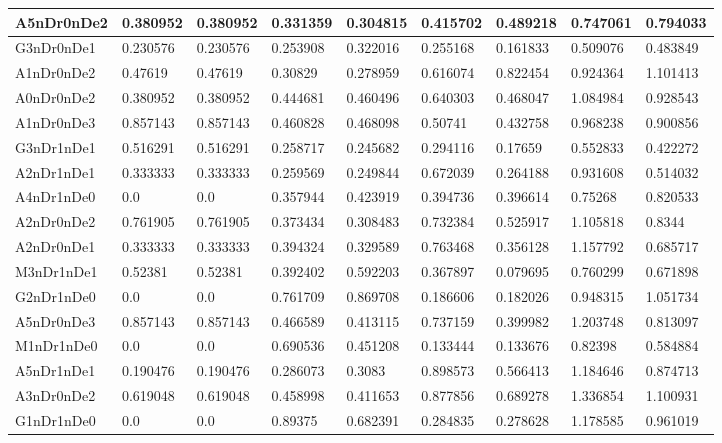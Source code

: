 \documentclass[../thesis.tex]{subfiles}
\begin{document}
\begin{table}[!ht]
\begin{tabular}{|l|l|l|l|l|l|l|l|l|}
        A5nDr0nDe2 & 0.380952 & 0.380952 & 0.331359 & 0.304815 & 0.415702 & 0.489218 & 0.747061 & 0.794033 \\ \hline
        G3nDr0nDe1 & 0.230576 & 0.230576 & 0.253908 & 0.322016 & 0.255168 & 0.161833 & 0.509076 & 0.483849 \\ \hline
        A1nDr0nDe2 & 0.47619 & 0.47619 & 0.30829 & 0.278959 & 0.616074 & 0.822454 & 0.924364 & 1.101413 \\ \hline
        A0nDr0nDe2 & 0.380952 & 0.380952 & 0.444681 & 0.460496 & 0.640303 & 0.468047 & 1.084984 & 0.928543 \\ \hline
        A1nDr0nDe3 & 0.857143 & 0.857143 & 0.460828 & 0.468098 & 0.50741 & 0.432758 & 0.968238 & 0.900856 \\ \hline
        G3nDr1nDe1 & 0.516291 & 0.516291 & 0.258717 & 0.245682 & 0.294116 & 0.17659 & 0.552833 & 0.422272 \\ \hline
        A2nDr1nDe1 & 0.333333 & 0.333333 & 0.259569 & 0.249844 & 0.672039 & 0.264188 & 0.931608 & 0.514032 \\ \hline
        A4nDr1nDe0 & 0.0 & 0.0 & 0.357944 & 0.423919 & 0.394736 & 0.396614 & 0.75268 & 0.820533 \\ \hline
        A2nDr0nDe2 & 0.761905 & 0.761905 & 0.373434 & 0.308483 & 0.732384 & 0.525917 & 1.105818 & 0.8344 \\ \hline
        A2nDr0nDe1 & 0.333333 & 0.333333 & 0.394324 & 0.329589 & 0.763468 & 0.356128 & 1.157792 & 0.685717 \\ \hline
        M3nDr1nDe1 & 0.52381 & 0.52381 & 0.392402 & 0.592203 & 0.367897 & 0.079695 & 0.760299 & 0.671898 \\ \hline
        G2nDr1nDe0 & 0.0 & 0.0 & 0.761709 & 0.869708 & 0.186606 & 0.182026 & 0.948315 & 1.051734 \\ \hline
        A5nDr0nDe3 & 0.857143 & 0.857143 & 0.466589 & 0.413115 & 0.737159 & 0.399982 & 1.203748 & 0.813097 \\ \hline
        M1nDr1nDe0 & 0.0 & 0.0 & 0.690536 & 0.451208 & 0.133444 & 0.133676 & 0.82398 & 0.584884 \\ \hline
        A5nDr1nDe1 & 0.190476 & 0.190476 & 0.286073 & 0.3083 & 0.898573 & 0.566413 & 1.184646 & 0.874713 \\ \hline
        A3nDr0nDe2 & 0.619048 & 0.619048 & 0.458998 & 0.411653 & 0.877856 & 0.689278 & 1.336854 & 1.100931 \\ \hline
        G1nDr1nDe0 & 0.0 & 0.0 & 0.89375 & 0.682391 & 0.284835 & 0.278628 & 1.178585 & 0.961019 \\ \hline

\end{tabular}
\end{table}
\end{document}
